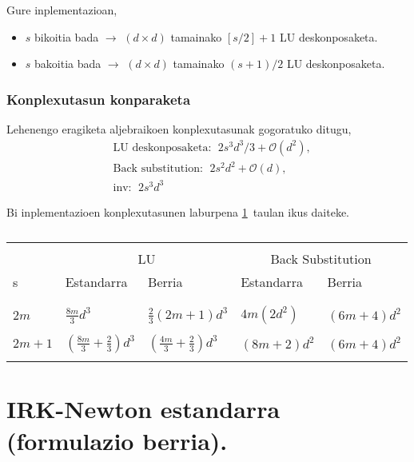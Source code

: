 Gure inplementazioan,
\begin{itemize}
\item $s$ bikoitia bada $\rightarrow$ $(d \times d)$ tamainako $[s/2]+1$  LU deskonposaketa.
\item $s$ bakoitia bada $\rightarrow$ $(d \times d)$ tamainako $(s+1)/2$  LU deskonposaketa.
\end{itemize}

\subsubsection*{Konplexutasun konparaketa}

Lehenengo eragiketa aljebraikoen konplexutasunak gogoratuko ditugu,
\begin{align*}
&\text{LU deskonposaketa}:  \ \ 2s^3d^3/3+\mathcal{O}(d^2), \\
&\text{Back substitution}:  \ \ 2s^2d^2+\mathcal{O}(d), \\
&\text{inv}: \ \ 2s^3d^3
\end{align*}

Bi inplementazioen konplexutasunen laburpena \ref{tab:Olu}~taulan ikus daiteke.
\begin{table}[h!]
\caption[LU deskonposaketak] 
{\small{}}
\label{tab:Olu}       
\centering
{%
\begin{tabular}{ l l l l l } 
 \hline
\\
                 &  \multicolumn{2}{c}{LU}  & \multicolumn{2}{c}{Back Substitution}  \\
 s               & Estandarra  & Berria     &  Estandarra  &              Berria     \\
\\
 \hline
\\
 $2m$            &   $\frac{8m}{3} d^3$                              &  $\frac{2}{3} (2m+1) d^3$ 
                 &   $4m (2d^2)$      &     $(6m+4)d^2$                                             \\
 \\
 $2m+1$          &   $\left(\frac{8m}{3} + \frac{2}{3}\right) d^3$   &  $\left(\frac{4m}{3}+\frac{2}{3}\right) d^3$
                 &   $(8m+2)d^2$      &     $(6m+4)d^2$\\  
 \\  
   \hline
 \end{tabular}}
\end{table}

\section{IRK-Newton estandarra (formulazio berria).}
\label{sec:7.4}

